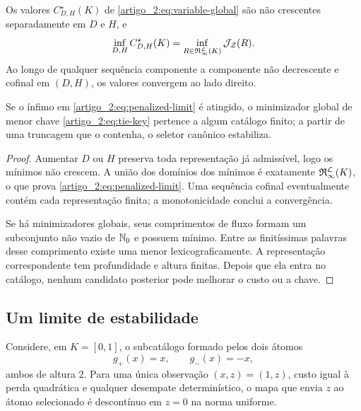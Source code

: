 \begin{proposition}\label{map:artigo_2:9.4}
\label{artigo_2:prop:truncation-convergence}
Os valores $C_{D,H}^{\star}(K)$ de \eqref{artigo_2:eq:variable-global} são não
crescentes separadamente em $D$ e $H$, e
\begin{equation}
 \inf_{D,H}C_{D,H}^{\star}(K)
 =\inf_{R\in\mathfrak{R}_{\infty}^{\mathcal{L}}(K)}
   \mathcal{J}_{\mathcal Z}(R).
 \label{artigo_2:eq:penalized-limit}
\end{equation}
Ao longo de qualquer sequência componente a componente não decrescente e
cofinal em $(D,H)$, os valores convergem ao lado direito.

Se o ínfimo em \eqref{artigo_2:eq:penalized-limit} é atingido, o minimizador global de
menor chave \eqref{artigo_2:eq:tie-key} pertence a algum catálogo finito; a partir de
uma truncagem que o contenha, o seletor canônico estabiliza.
\end{proposition}

\begin{proof}
Aumentar $D$ ou $H$ preserva toda representação já admissível, logo os
mínimos não crescem. A união dos domínios dos mínimos é exatamente
$\mathfrak{R}_{\infty}^{\mathcal{L}}(K)$, o que prova
\eqref{artigo_2:eq:penalized-limit}. Uma sequência cofinal eventualmente contém cada
representação finita; a monotonicidade conclui a convergência.

Se há minimizadores globais, seus comprimentos de fluxo formam um subconjunto
não vazio de $\mathbb{N}_0$ e possuem mínimo. Entre as finitíssimas palavras desse
comprimento existe uma menor lexicograficamente. A representação
correspondente tem profundidade e altura finitas. Depois que ela entra no
catálogo, nenhum candidato posterior pode melhorar o custo ou a chave.
\end{proof}

\subsection{Um limite de estabilidade}

\begin{proposition}\label{map:artigo_2:9.5}
\label{artigo_2:prop:instability}
Considere, em $K=[0,1]$, o subcatálogo formado pelos dois átomos
\[
 g_+(x)=x,\qquad g_-(x)=-x,
\]
ambos de altura $2$. Para uma única observação $(x,z)=(1,z)$, custo igual à
perda quadrática e qualquer desempate determinístico, o mapa que envia $z$ ao
átomo selecionado é descontínuo em $z=0$ na norma uniforme.
\end{proposition}

